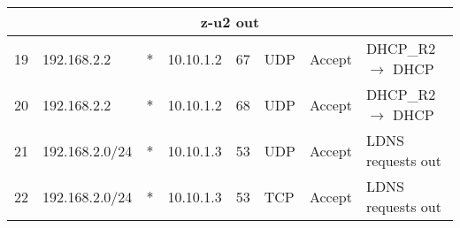 \documentclass[a4paper, 11pt, oneside]{article}
\begin{document}
\begin{table}[H]
{\begin{tabular}{|llllllll|}
\multicolumn{8}{|c|}{{\color[HTML]{FE0000} z-u2 out}}                                                                                                                                                                                                                                                                                                                                                                                                                                                                                  \\ \hline
\multicolumn{1}{|l|}{19}                        & \multicolumn{1}{l|}{192.168.2.2}                                                  & \multicolumn{1}{l|}{*}                                                          & \multicolumn{1}{l|}{10.10.1.2}                                                         & \multicolumn{1}{l|}{67}                                                               & \multicolumn{1}{l|}{UDP}               & \multicolumn{1}{l|}{Accept}          & DHCP\_R2 $\rightarrow$ DHCP            \\ \hline
\multicolumn{1}{|l|}{20}                        & \multicolumn{1}{l|}{192.168.2.2}                                                  & \multicolumn{1}{l|}{*}                                                          & \multicolumn{1}{l|}{10.10.1.2}                                                         & \multicolumn{1}{l|}{68}                                                               & \multicolumn{1}{l|}{UDP}               & \multicolumn{1}{l|}{Accept}          & DHCP\_R2 $\rightarrow$ DHCP            \\ \hline
\multicolumn{1}{|l|}{21}                        & \multicolumn{1}{l|}{192.168.2.0/24}                                               & \multicolumn{1}{l|}{*}                                                              & \multicolumn{1}{l|}{10.10.1.3}                                                         & \multicolumn{1}{l|}{53}                                                                  & \multicolumn{1}{l|}{UDP}               & \multicolumn{1}{l|}{Accept}          & LDNS requests out                      \\ \hline
\multicolumn{1}{|l|}{22}                        & \multicolumn{1}{l|}{192.168.2.0/24}                                               & \multicolumn{1}{l|}{*}                                                              & \multicolumn{1}{l|}{10.10.1.3}                                                         & \multicolumn{1}{l|}{53}                                                                  & \multicolumn{1}{l|}{TCP}               & \multicolumn{1}{l|}{Accept}          & LDNS requests out                      \\ \hline

\end{tabular}}
\end{table}
\end{document}
